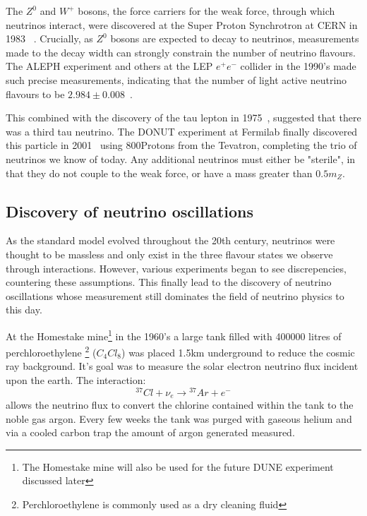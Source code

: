 The $Z^{0}$ and $W^{+}$ bosons, the force carriers for the weak force, through which neutrinos
interact, were discovered at the Super Proton Synchrotron at CERN in 1983
~\cite{arnison1983_z,arnison1983_w}. Crucially, as $Z^{0}$ bosons are expected to decay to
neutrinos, measurements made to the decay width can strongly constrain the number of neutrino
flavours. The ALEPH experiment and others at the LEP $e^{+}e^{-}$ collider in the 1990's made
such precise measurements, indicating that the number of light active neutrino flavours to be
$2.984\pm0.008$~\cite{electroweak2006}.

This combined with the discovery of the tau lepton in 1975~\cite{perl1975}, suggested that there
was a third tau neutrino. The DONUT experiment at Fermilab finally discovered this particle in
2001~\cite{Kodama2001} using 800\GeV Protons from the Tevatron, completing the trio of neutrinos
we know of today. Any additional neutrinos must either be "sterile", in that they do not couple
to the weak force, or have a mass greater than $0.5m_{Z}$.

\subsection{Discovery of neutrino oscillations} %
\label{sec:theory_history_neutrinos}

As the standard model evolved throughout the 20th century, neutrinos were thought to be massless
and only exist in the three flavour states we observe through interactions. However, various
experiments began to see discrepencies, countering these assumptions. This finally lead to the
discovery of neutrino oscillations whose measurement still dominates the field of neutrino
physics to this day.

At the Homestake mine\footnote{The Homestake mine will also be used for the future DUNE experiment
    discussed later} in the 1960's a large tank filled with 400000 litres of perchloroethylene
\footnote{Perchloroethylene is commonly used as a dry cleaning fluid} ($C_{4}Cl_{8}$) was placed
1.5km underground to reduce the cosmic ray background. It's goal was to measure the solar electron
neutrino flux incident upon the earth. The interaction:
\begin{equation} %
    {}^{37}Cl+\nu_{e}\rightarrow{}^{37}Ar+e^{-}
\end{equation} %
allows the neutrino flux to convert the chlorine contained within the tank to the noble gas argon.
Every few weeks the tank was purged with gaseous helium and via a cooled carbon trap the amount of
argon generated measured.

